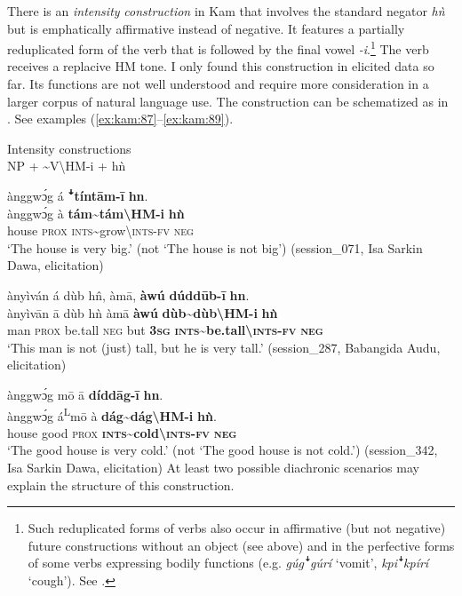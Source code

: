 \documentclass[output=paper,colorlinks,citecolor=brown]{langscibook}
\begin{document}
There is an \textit{intensity} \textit{construction} in Kam that involves the standard negator \textit{hǹ} but is emphatically affirmative instead of negative. It features a partially reduplicated form of the verb that is followed by the final vowel \textit{{}-i}.\footnote{Such reduplicated forms of verbs also occur in affirmative (but not negative) future constructions without an object (see  above) and in the perfective forms of some verbs expressing bodily functions (e.g. \textit{gúgꜜgúrí} ‘vomit’, \textit{kpiꜜkpírí} ‘cough’). See \citet[266--268]{Lesage2020}.} The verb receives a replacive HM tone. I only found this construction in elicited data so far. Its functions are not well understood and require more consideration in a larger corpus of natural language use. The construction can be schematized as in . See examples (\ref{ex:kam:87}--\ref{ex:kam:89}).

\ea\label{ex:kam:86} 
    Intensity constructions\\
    NP + {\textasciitilde}V{\textbackslash}HM-i + hǹ
\z

\ea\label{ex:kam:87} 
    \glll  ànggwɔ́g á \textbf{ꜜtíntām-ī} \textbf{hn}.\\
        ànggwɔ́g à \textbf{tám{\textasciitilde}tám{\textbackslash}HM-i} \textbf{hǹ}\\
        house \textsc{prox} \textsc{ints}{\textasciitilde}grow{\textbackslash}\textsc{ints}{}-\textsc{fv} \textsc{neg}\\
    \glt ‘The house is very big.’ (not ‘The house is not big’) (session\_071, Isa Sarkin Dawa, elicitation)
\z 

\ea\label{ex:kam:88} 
    \glll ànyìván á dùb h\^{n}, àmā, \textbf{àwú} \textbf{dúddūb-ī} \textbf{hn}.\\
        ànyìvān ā dùb hǹ àmā \textbf{àwú} \textbf{dùb{\textasciitilde}dùb{\textbackslash}HM-i} \textbf{hǹ}\\
        man \textsc{prox} be.tall \textsc{neg} but \textbf{\textsc{3sg}} \textbf{\textsc{ints}}\textbf{{\textasciitilde}be.tall{\textbackslash}}\textbf{\textsc{ints}}\textbf{{}-}\textbf{\textsc{fv}} \textbf{\textsc{neg}}\\
    \glt ‘This man is not (just) tall, but he is very tall.’ (session\_287, Babangida Audu, elicitation)
\z 

\ea\label{ex:kam:89} 
    \glll ànggwɔ́g mō ā \textbf{díddāg-ī} \textbf{hn}.\\
        ànggwɔ́g á\textsuperscript{L}mō à \textbf{dág{\textasciitilde}dág{\textbackslash}HM-i} \textbf{hǹ}.\\
        house good \textsc{prox} \textbf{\textsc{ints}}\textbf{{\textasciitilde}cold{\textbackslash}}\textbf{\textsc{ints}}\textbf{{}-}\textbf{\textsc{fv}} \textbf{\textsc{neg}}\\
    \glt ‘The good house is very cold.’ (not ‘The good house is not cold.’) (session\_342, Isa Sarkin Dawa, elicitation)
\z 
At least two possible diachronic scenarios may explain the structure of this construction. 
\end{document}
